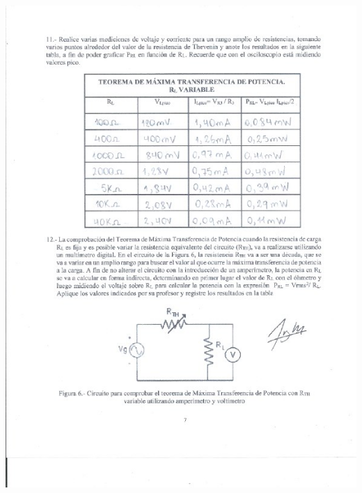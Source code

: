 \documentclass[12pt]{article}
\begin{document}
	\includegraphics[width=16cm,height=21cm]{Img/Resultados_5}\\
\end{document}
